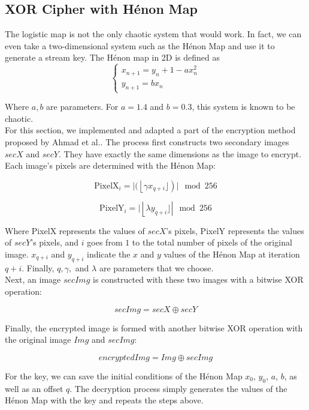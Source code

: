 \documentclass[10pt]{article}
\begin{document}
    \subsection{XOR Cipher with Hénon Map}
    
    The logistic map is not the only chaotic system that would work. In fact, we can even take a two-dimensional system such as the Hénon Map and use it to generate a stream key. The Hénon map in 2D is defined as
    $$\begin{cases}
        x_{n+1} = y_n +1 - ax_n^2\\
        y_{n+1} = bx_n
    \end{cases}$$
    
    Where $a, b$ are parameters. For $a=1.4$ and $b=0.3$, this system is known to be chaotic.\\
    
    For this section, we implemented and adapted a part of the encryption method proposed by Ahmad et al.\cite{Ahmad}. The process first constructs two secondary images $secX$ and $secY$. They have exactly the same dimensions as the image to encrypt. Each image's pixels are determined with the Hénon Map:
    
    $$\text{PixelX}_i = \lvert (\left \lfloor \gamma x_{q+i}  \rfloor \right)  \rvert \mod 256$$
    
    $$\text{PixelY}_i = \vert \left \lfloor \lambda y_{q+i}  \rfloor \right  \rvert \mod 256$$

    Where PixelX represents the values of $secX$'s pixels, PixelY represents the values of $secY$'s pixels, and $i$ goes from $1$ to the total number of pixels of the original image. $x_{q+i}$ and $y_{q+i}$ indicate the $x$ and $y$ values of the Hénon Map at iteration $q+i$. Finally, $q, \gamma,$ and $\lambda$ are parameters that we choose.\\
    
    Next, an image $secImg$ is constructed with these two images with a bitwise XOR operation:
    
    $$ secImg = secX \oplus secY$$
    
    Finally, the encrypted image is formed with another bitwise XOR operation with the original image $Img$ and $secImg$:
    
    $$ encryptedImg = Img \oplus secImg$$
    
    
    For the key, we can save the initial conditions of the Hénon Map $x_0$, $y_0$, $a$, $b$, as well as an offset $q$. The decryption process simply generates the values of the Hénon Map with the key and repeats the steps above.\\
    
\end{document}
